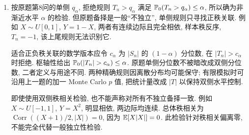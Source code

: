 \begin{solution}
\begin{enumerate}[label=\arabic*.]
\begin{verbatim}
spearman_quantiles <- function(n, alpha=.05, B=50000) {
  stopifnot(n>=2, alpha>0, alpha<1)
  r <- seq_len(n) - (n+1)/2
  den <- sum(r*r)
  val <- replicate(B, sum(r*(sample.int(n)-(n+1)/2))/den)
  k <- ceiling(B*(1-alpha))
  c(one_sided=sort(val)[k], two_sided=sort(abs(val))[k])
}
set.seed(65007)
spearman_quantiles(10)
\end{verbatim}
本项目运行的是对应 Python 算法, 未运行R. 在 $n=10$, $\alpha=0.05$ 的50000次模拟示例中, 单侧分位数约0.55152, 绝对值分位数约0.63636. 精确分布可在规模允许时枚举 $n!$ 个排列而得. $n=10$ 为验算示例, 不属于原题给定数据.
\item 按原题第8问的单侧 $q_\alpha$, 拒绝规则 $T_n>q_\alpha$ 满足 $\mathbb P_0(T_n>q_\alpha)\le\alpha$, 所以确为非渐近水平 $\alpha$ 的检验. 但原题备择是一般“不独立”, 单侧规则只寻找正秩关联. 例如 $X\sim U[0,1]$, $Y=1-X$, 两者有连续边际且完全相依, 样本秩反序, $T_n=-1$, 该上尾规则无法识别它.

适合正负秩关联的数学版本应令 $c_\alpha$ 为 $|S_n|$ 的 $(1-\alpha)$ 分位数, 在 $|T_n|>c_\alpha$ 时拒绝. 枢轴性给出 $\PP_0(|T_n|>c_\alpha)\le\alpha$. 原题单侧分位数不被暗改成双侧分位数, 二者定义与用途不同. 两种精确规则因离散分布均可能保守; 有限模拟时可沿用上一题的加一 Monte Carlo $p$ 值, 把统计量改成 $|T|$ 以保持双侧水平控制.

即使使用双侧秩相关检验, 也不能声称对所有不独立备择一致. 例如 $X\sim U[-1,1]$, $Y=X^2$, 明显相依, 两边际均连续. 总体秩相关为 $\operatorname{Corr}((X+1)/2,|X|)=0$, 因为 $\mathbb E[X|X|]=0$. 此检验针对秩相关偏离零, 不能完全代替一般独立性检验.
\end{enumerate}
\end{solution}
